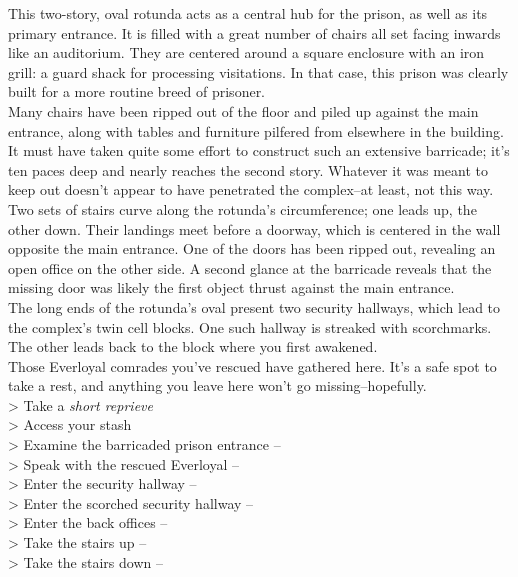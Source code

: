 This two-story, oval rotunda acts as a central hub for the prison, as well as its primary entrance. It is filled with a great number of chairs all set facing inwards like an auditorium. They are centered around a square enclosure with an iron grill: a guard shack for processing visitations. In that case, this prison was clearly built for a more routine breed of prisoner.\\

Many chairs have been ripped out of the floor and piled up against the main entrance, along with tables and furniture pilfered from elsewhere in the building. It must have taken quite some effort to construct such an extensive barricade; it’s ten paces deep and nearly reaches the second story. Whatever it was meant to keep out doesn’t appear to have penetrated the complex--at least, not this way.\\

Two sets of stairs curve along the rotunda’s circumference; one leads up, the other down. Their landings meet before a doorway, which is centered in the wall opposite the main entrance. One of the doors has been ripped out, revealing an open office on the other side. A second glance at the barricade reveals that the missing door was likely the first object thrust against the main entrance.\\

The long ends of the rotunda's oval present two security hallways, which lead to the complex’s twin cell blocks. One such hallway is streaked with scorchmarks. The other leads back to the block where you first awakened.\\

Those Everloyal comrades you’ve rescued have gathered here. It’s a safe spot to take a rest, and anything you leave here won’t go missing--hopefully.\\

> Take a \emph{short reprieve}\\
> Access your stash\\
> Examine the barricaded prison entrance -- \\
> Speak with the rescued Everloyal -- \\
> Enter the security hallway -- \\
> Enter the scorched security hallway -- \\
> Enter the back offices -- \\
> Take the stairs up -- \\
> Take the stairs down -- 